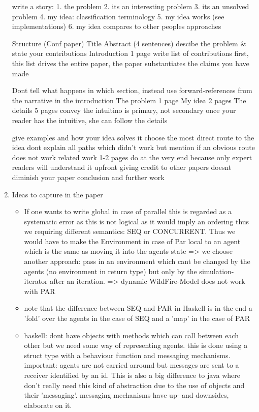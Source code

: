 \begin{enumerate}
write a story:
	1. the problem
	2. its an interesting problem
	3. its an unsolved problem
	4. my idea: classification terminology
	5. my idea works (see implementations)
	6. my idea compares to other peoples approaches
	
Structure (Conf paper)
	Title
	Abstract (4 sentences)
		descibe the problem & state your contributions
	Introduction 1 page
		write list of contributions first,
		this list drives the entire paper,
		the paper substantiates the claims you have made
		
		Dont tell what happens in which section,
		instead use forward-references from the
		narrative in the introduction
	The problem 1 page
	My idea 2 pages
	The details 5 pages
		convey the intuitino is primary, not secondary
		once your reader has the intuitive, she can follow the details
		
		give examples and how your idea solves it
		choose the most direct route to the idea
			dont explain all paths which didn't work
			but mention if an obvious route does not work
	related work 1-2 pages
		do at the very end because only expert readers will understand it upfront
		giving credit to other papers doesnt diminish your paper
	conclusion and further work

\item Ideas to capture in the paper
	\begin{itemize}
		\item If one wants to write global in case of parallel this is regarded as a systematic error as this is not logical as it would imply an ordering thus we requiring different semantics: SEQ or CONCURRENT. Thus we would have to make the Environment in case of Par local to an agent which is the same as moving it into the agents state => we choose another approach: pass in an environment which cant be changed by the agents (no environment in return type) but only by the simulation-iterator after an iteration.  => dynamic WildFire-Model does not work with PAR
		\item note that the difference between SEQ and PAR in Haskell is in the end a 'fold' over the agents in the case of SEQ and a 'map' in the case of PAR
		\item haskell: dont have objects with methods which can call between each other but we need some way of representing agents. this is done using a struct type with a behaviour function and messaging mechanisms. important: agents are not carried arround but messages are sent to a receiver identified by an id. This is also a big difference to java where don't really need this kind of abstraction due to the use of objects and their 'messaging'. messaging mechanisms have up- and downsides, elaborate on it.


\end{itemize}
\end{enumerate}
